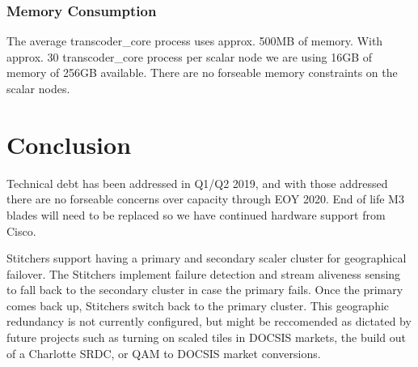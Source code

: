 \documentclass{article}
\begin{document}
\subsubsection{Memory Consumption}
\label{SECTION-Memory}

The average transcoder\_core process uses approx. 500MB of memory. With approx. 30 transcoder\_core process per scalar node we are using 16GB of memory of 256GB available. There are no forseable memory constraints on the scalar nodes. 



\section{Conclusion}
\label{SECTION-Conclusion}

Technical debt has been addressed in Q1/Q2 2019, and with those addressed there are no forseable concerns over capacity through EOY 2020. End of life M3 blades will need to be replaced so we have continued hardware support from Cisco. 

Stitchers support having a primary and secondary scaler cluster for geographical failover. The Stitchers implement failure detection and stream aliveness sensing to fall back to the secondary cluster in case the primary fails. Once the primary comes back up, Stitchers switch back to the primary cluster. This geographic redundancy is not currently configured, but might be reccomended as dictated by future projects such as turning on scaled tiles in DOCSIS markets, the build out of a Charlotte SRDC, or QAM to DOCSIS market conversions.
\end{document}
